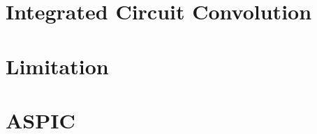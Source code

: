 \documentclass[pdflatex,sn-mathphys]{sn-jnl}%
\theoremstyle{thmstyleone}%
\theoremstyle{thmstyletwo}%
\theoremstyle{thmstylethree}%
\begin{document}
\section{Integrated Circuit Convolution}\label{sec1}

\section{Limitation}\label{sec2}

\section{ASPIC}\label{sec3}


\end{document}
